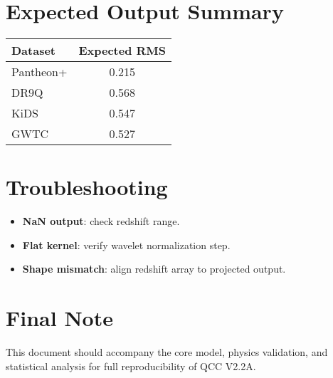 \documentclass[12pt]{article}
\begin{document}
\section{Expected Output Summary}
\begin{tabular}{l|c}
\textbf{Dataset} & \textbf{Expected RMS} \\
\hline
Pantheon+ & 0.215 \\
DR9Q      & 0.568 \\
KiDS      & 0.547 \\
GWTC      & 0.527 \\
\end{tabular}

\section{Troubleshooting}
\begin{itemize}
\item \textbf{NaN output}: check redshift range.
\item \textbf{Flat kernel}: verify wavelet normalization step.
\item \textbf{Shape mismatch}: align redshift array to projected output.
\end{itemize}

\section*{Final Note}
This document should accompany the core model, physics validation, and statistical analysis for full reproducibility of QCC V2.2A.
\end{document}

